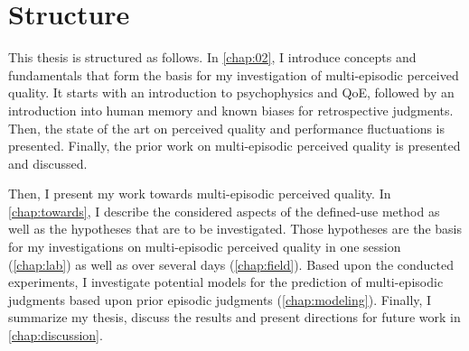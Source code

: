 \section{Structure}
This thesis is structured as follows.
In \autoref{chap:02}, I introduce concepts and fundamentals that form the basis for my investigation of multi-episodic perceived quality.
It starts with an introduction to psychophysics and \ac{QoE}, followed by an introduction into human memory and known biases for retrospective judgments.
Then, the state of the art on perceived quality and performance fluctuations is presented.
Finally, the prior work on multi-episodic perceived quality is presented and discussed.

Then, I present my work towards multi-episodic perceived quality. %
In \autoref{chap:towards}, I describe the considered aspects of the defined-use method as well as the hypotheses that are to be investigated.
Those hypotheses are the basis for my investigations on multi-episodic perceived quality in one session (\autoref{chap:lab}) as well as over several days (\autoref{chap:field}).
Based upon the conducted experiments, I investigate potential models for the prediction of multi-episodic judgments based upon prior episodic judgments (\autoref{chap:modeling}).
Finally, I summarize my thesis, discuss the results and present directions for future work in \autoref{chap:discussion}.